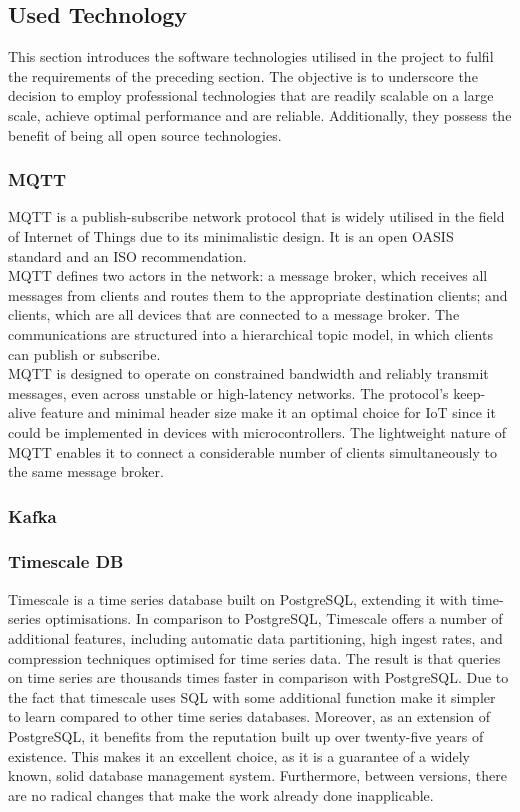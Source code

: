 \subsection{Used Technology}
This section introduces the software technologies utilised in the project to fulfil the requirements of the preceding section. The objective is to underscore the decision to employ professional technologies that are readily scalable on a large scale, achieve optimal performance and are reliable. Additionally, they possess the benefit of being all open source technologies.
\subsubsection{MQTT}
MQTT is a publish-subscribe network protocol that is widely utilised in the field of Internet of Things due to its minimalistic design. It is an open OASIS standard and an ISO recommendation.\\
MQTT defines two actors in the network: a message broker, which receives all messages from clients and routes them to the appropriate destination clients; and clients, which are all devices that are connected to a message broker. The communications are structured into a hierarchical topic model, in which clients can publish or subscribe.\\
MQTT is designed to operate on constrained bandwidth and reliably transmit messages, even across unstable or high-latency networks. The protocol's keep-alive feature and minimal header size make it an optimal choice for IoT since it could be implemented in devices with microcontrollers. The lightweight nature of MQTT enables it to connect a considerable number of clients simultaneously to the same message broker.\\
\subsubsection{Kafka}

\subsubsection{Timescale DB}
Timescale is a time series database built on PostgreSQL, extending it with time-series optimisations. In comparison to PostgreSQL, Timescale offers a number of additional features, including automatic data partitioning, high ingest rates, and compression techniques optimised for time series data. The result is that queries on time series are thousands times faster in comparison with PostgreSQL. Due to the fact that timescale uses SQL with some additional function make it simpler to learn compared to other time series databases. Moreover, as an extension of PostgreSQL, it benefits from the reputation built up over twenty-five years of existence. This makes it an excellent choice, as it is a guarantee of a widely known, solid database management system. Furthermore, between versions, there are no radical changes that make the work already done inapplicable.
